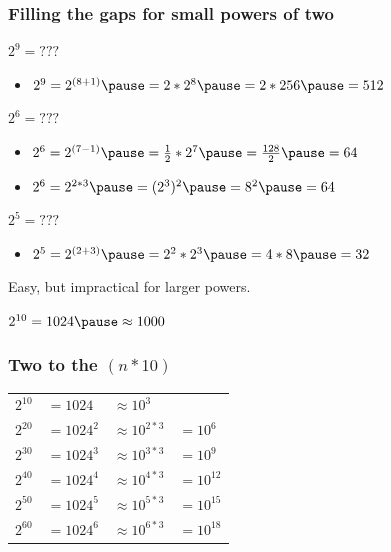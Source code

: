 \documentclass[aspectratio=43]{beamer}
\begin{document}

\begin{frame}[fragile]

  \frametitle{Filling the gaps for small powers of two}

  $2^9 = ???$
  \pause
  \begin{itemize}
    \item {$2^9 = 2^{(8 + 1)} \pause = 2 * 2^8 \pause = 2 * 256 \pause = 512$}
  \end{itemize}

  \pause
  $2^6 = ???$
  \begin{itemize}
    \pause
    \item $2^6 = 2^{(7 - 1)} \pause = \frac{1}{2}* 2^7 \pause = \frac{128}{2} \pause = 64$
    \pause
    \item $2^6 = 2^{2*3} \pause = (2^3)^2 \pause = 8^2 \pause = 64$
  \end{itemize}

  \pause
  $2^5 = ???$
  \pause
  \begin{itemize}
    \item $2^5 = 2^{(2+3)} \pause = 2^2 * 2^3 \pause = 4 * 8 \pause = 32$
  \end{itemize}

  \pause

  \vspace{10pt}
  Easy, but impractical for larger powers.

\end{frame}


\begin{frame}[fragile]

\begin{center}
\huge{$2^{10} = 1024 \pause \approx 1000$}
\end{center}

\end{frame}


\begin{frame}[fragile]

  \frametitle{Two to the $(n * 10)$}
  \renewcommand{\arraystretch}{1.5}
  \begin{tabular}{ l l l l }
    $2^{10} $ & $ = 1024   $ & $ \approx 10^{3}  $ &              \\ \pause
    $2^{20} $ & $ = 1024^2 $ & $ \approx 10^{2*3}$ & $ = 10^{6}$  \\ \pause
    $2^{30} $ & $ = 1024^3 $ & $ \approx 10^{3*3}$ & $ = 10^{9}$  \\ \pause
    $2^{40} $ & $ = 1024^4 $ & $ \approx 10^{4*3}$ & $ = 10^{12}$ \\
    $2^{50} $ & $ = 1024^5 $ & $ \approx 10^{5*3}$ & $ = 10^{15}$ \\
    $2^{60} $ & $ = 1024^6 $ & $ \approx 10^{6*3}$ & $ = 10^{18}$ \\
  \end{tabular}

\end{frame}
\end{document}
